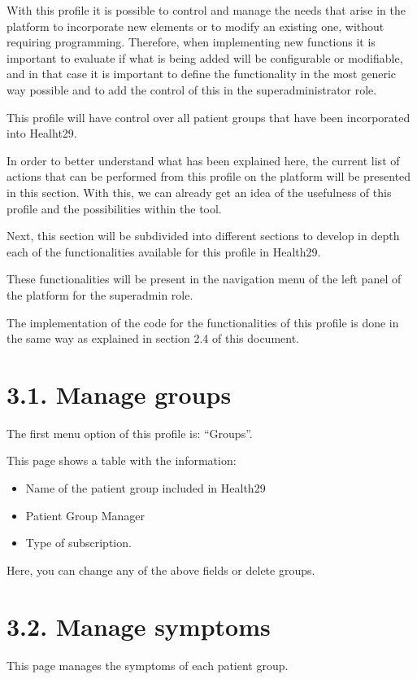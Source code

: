 \documentclass[letterpaper,10pt,english]{sphinxmanual}
\begin{document}
With this profile it is possible to control and manage the needs that arise in the platform to incorporate new elements or to modify an existing one, without requiring programming. Therefore, when implementing new functions it is important to evaluate if what is being added will be configurable or modifiable, and in that case it is important to define the functionality in the most generic way possible and to add the control of this in the super\sphinxhyphen{}administrator role.

This profile will have control over all patient groups that have been incorporated into Healht29.

In order to better understand what has been explained here, the current list of actions that can be performed from this profile on the platform will be presented in this section. With this, we can already get an idea of the usefulness of this profile and the possibilities within the tool.

Next, this section will be subdivided into different sections to develop in depth each of the functionalities available for this profile in Health29.

These functionalities will be present in the navigation menu of the left panel of the platform for the superadmin role.

The implementation of the code for the functionalities of this profile is done in the same way as explained in section 2.4 of this document.


\section{3.1. Manage groups}
\label{\detokenize{pages/Superadmin profile:manage-groups}}
The first menu option of this profile is: “Groups”.



This page shows a table with the information:
\begin{itemize}
\item {} 
Name of the patient group included in Health29

\item {} 
Patient Group Manager

\item {} 
Type of subscription.

\end{itemize}

Here, you can change any of the above fields or delete groups.


\section{3.2. Manage symptoms}
\label{\detokenize{pages/Superadmin profile:manage-symptoms}}
This page manages the symptoms of each patient group.
\end{document}
